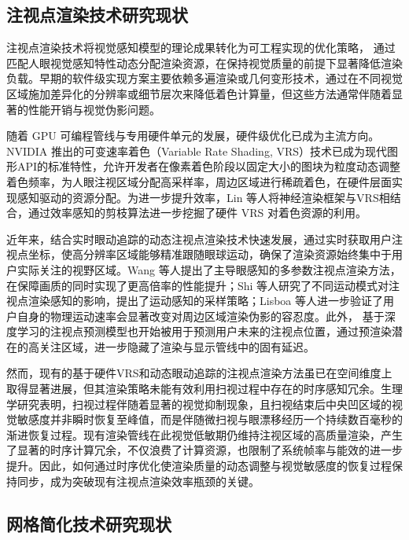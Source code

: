 \subsection{注视点渲染技术研究现状}
注视点渲染技术将视觉感知模型的理论成果转化为可工程实现的优化策略，
通过匹配人眼视觉感知特性动态分配渲染资源，在保持视觉质量的前提下显著降低渲染负载。早期的软件级实现方案主要依赖多遍渲染或几何变形技术，通过在不同视觉区域施加差异化的分辨率或细节层次来降低着色计算量，但这些方法通常伴随着显著的性能开销与视觉伪影问题\cite{1-2-11}。

随着 GPU 可编程管线与专用硬件单元的发展，硬件级优化已成为主流方向。NVIDIA 推出的可变速率着色（Variable Rate Shading, VRS）技术\cite{1-2-11-1}已成为现代图形API的标准特性，允许开发者在像素着色阶段以固定大小的图块为粒度动态调整着色频率，为人眼注视区域分配高采样率，周边区域进行稀疏着色，在硬件层面实现感知驱动的资源分配。为进一步提升效率，Lin 等人将神经渲染框架与VRS相结合，通过效率感知的剪枝算法进一步挖掘了硬件 VRS 对着色资源的利用\cite{1-2-13}。

近年来，结合实时眼动追踪的动态注视点渲染技术快速发展，通过实时获取用户注视点坐标，使高分辨率区域能够精准跟随眼球运动，确保了渲染资源始终集中于用户实际关注的视野区域\cite{1-2-13-1}。Wang 等人提出了主导眼感知的多参数注视点渲染方法，在保障画质的同时实现了更高倍率的性能提升\cite{1-2-14}；Shi 等人研究了不同运动模式对注视点渲染感知的影响，提出了运动感知的采样策略\cite{1-2-14-1}；Lisboa 等人进一步验证了用户自身的物理运动速率会显著改变对周边区域渲染伪影的容忍度\cite{1-2-14-2}。此外，
基于深度学习的注视点预测模型也开始被用于预测用户未来的注视点位置，通过预渲染潜在的高关注区域，进一步隐藏了渲染与显示管线中的固有延迟\cite{1-2-15, 1-2-15-1}。

然而，现有的基于硬件VRS和动态眼动追踪的注视点渲染方法虽已在空间维度上取得显著进展，但其渲染策略未能有效利用扫视过程中存在的时序感知冗余。生理学研究表明，扫视过程伴随着显著的视觉抑制现象，且扫视结束后中央凹区域的视觉敏感度并非瞬时恢复至峰值，而是伴随微扫视与眼漂移经历一个持续数百毫秒的渐进恢复过程\cite{1-2-16, 1-2-18}。现有渲染管线在此视觉低敏期仍维持注视区域的高质量渲染，产生了显著的时序计算冗余，不仅浪费了计算资源，也限制了系统帧率与能效的进一步提升。因此，如何通过时序优化使渲染质量的动态调整与视觉敏感度的恢复过程保持同步，成为突破现有注视点渲染效率瓶颈的关键。



\subsection{网格简化技术研究现状}

